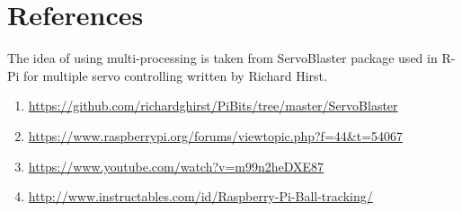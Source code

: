 \documentclass[11pt,a4paper]{article}
\begin{document}
	\section{References}
	The idea of using multi-processing is taken from ServoBlaster package used in R-Pi for  multiple servo controlling written by Richard Hirst.
	
	\begin{enumerate}
	\item \url{https://github.com/richardghirst/PiBits/tree/master/ServoBlaster}

     \item \url{https://www.raspberrypi.org/forums/viewtopic.php?f=44&t=54067}
     \item \url{https://www.youtube.com/watch?v=m99n2heDXE87}
      \item \url{http://www.instructables.com/id/Raspberry-Pi-Ball-tracking/}
   \end{enumerate}
	
\end{document}
